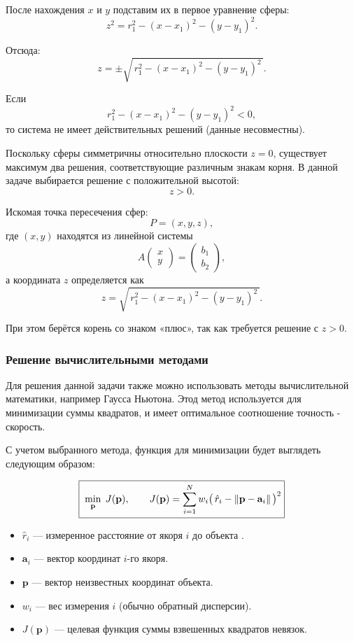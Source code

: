 \documentclass[a4paper,12pt]{article} %
\newcounter{subsubsubsection}[subsubsection]
\begin{document}

После нахождения \(x\) и \(y\) подставим их в первое уравнение сферы:
\[
z^2 = r_1^2 - (x - x_1)^2 - (y - y_1)^2.
\]

Отсюда:
\[
z = \pm\sqrt{\,r_1^2 - (x - x_1)^2 - (y - y_1)^2\,}.
\]

Если
\[
r_1^2 - (x - x_1)^2 - (y - y_1)^2 < 0,
\]
то система не имеет действительных решений (данные несовместны).

Поскольку сферы симметричны относительно плоскости \(z=0\), существует максимум два решения, соответствующие различным знакам корня.  
В данной задаче выбирается решение с положительной высотой:
\[
z > 0.
\]


Искомая точка пересечения сфер:
\[
P = (x, y, z),
\]
где \((x,y)\) находятся из линейной системы
\[
A\begin{pmatrix}x\\y\end{pmatrix} = \begin{pmatrix}b_1\\b_2\end{pmatrix},
\]
а координата \(z\) определяется как
\[
z = \sqrt{\,r_1^2 - (x - x_1)^2 - (y - y_1)^2\,}.
\]

При этом берётся корень со знаком «плюс», так как требуется решение с \(z>0\).

\subsubsection{Решение вычислительными методами}

Для решения данной задачи также можно использовать методы вычислительной математики, например Гаусса Ньютона. Этод метод используется для минимизации суммы квадратов, и имеет оптимальное соотношение точность - скорость.

С учетом выбранного метода, функция для минимизации будет выглядеть следующим образом:

\[
\boxed{%
\; \min_{\mathbf{p}}\; J(\mathbf{p}), \qquad
J(\mathbf{p}) = \sum_{i=1}^{N} w_i\bigl(\,\hat r_i - \|\mathbf{p}-\mathbf{a}_i\|\,\bigr)^2
}
\]

\begin{itemize}
  \item $\hat r_i$ \;— измеренное расстояние от якоря $i$ до объекта .
  \item $\mathbf{a}_i$ \;— вектор координат $i$-го якоря.
  \item $\mathbf{p}$ \;— вектор неизвестных координат объекта.
  \item $w_i$ \;— вес измерения $i$ (обычно обратный дисперсии).
  \item $J(\mathbf{p})$ \;— целевая функция суммы взвешенных квадратов невязок.
\end{itemize}
\end{document}
